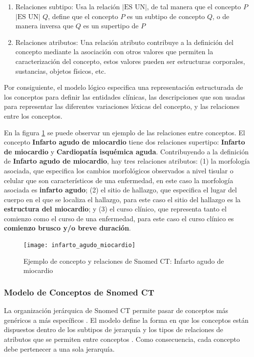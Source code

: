 \begin{enumerate}
\item Relaciones subtipo: Usa la relación $|\text{ES UN}|$, de tal manera que el concepto $P$ $|\text{ES UN}|$ $Q$,  define que el concepto $P$ es un subtipo de concepto $Q$, o de manera inversa que $Q$ es un supertipo de $P$
\item Relaciones atributos: Una relación atributo contribuye a la definición del concepto mediante la asociación con otros valores que permiten la caracterización del concepto, estos valores pueden ser estructuras corporales, sustancias, objetos físicos, etc.
\end{enumerate}

Por consiguiente, el modelo lógico especifica una representación estructurada de los conceptos para definir las entidades clínicas, las descripciones  que son usadas para representar las diferentes variaciones léxicas del concepto, y las relaciones entre los conceptos.\cite{ihtsdo2016SG}

En la figura \ref{fig:IAM} se puede observar un ejemplo de las relaciones entre conceptos. El concepto \textbf{Infarto agudo de miocardio} tiene dos relaciones supertipo:\textbf{ Infarto de miocardio} y \textbf{Cardiopatía isquémica aguda}. Contribuyendo a la definición de \textbf{Infarto agudo de miocardio}, hay tres relaciones atributos: (1) la morfología asociada, que especifica los cambios morfológicos observados a nivel tisular o celular que
son característicos de una enfermedad, en este caso la morfología asociada es \textbf{infarto agudo}; (2) el sitio de hallazgo, que especifica el lugar del cuerpo en el que se localiza el hallazgo, para este caso el sitio del hallazgo es la \textbf{estructura del miocardio}; y (3) el curso clínico, que representa tanto el comienzo como el curso de una enfermedad, para este caso el curso clínico es \textbf{comienzo brusco y/o breve duración}.

\begin{figure}
\caption{Ejemplo de concepto y relaciones de Snomed CT: Infarto agudo de miocardio}
\label{fig:IAM}
\centering
\texttt{[image: infarto\_agudo\_miocardio]}
\end{figure}


\subsubsection{Modelo de Conceptos de Snomed CT}
La organización jerárquica de Snomed CT permite pasar de conceptos más genéricos a más específicos \cite{Bhattacharyya2016}. El modelo define la forma en que los conceptos están dispuestos dentro de los subtipos de jerarquía y los tipos de relaciones de atributos que se permiten entre conceptos \cite{Bhattacharyya2016,ihtsdo2016SG}. Como consecuencia, cada concepto debe pertenecer a una sola jerarquía.
% 
% 
 
